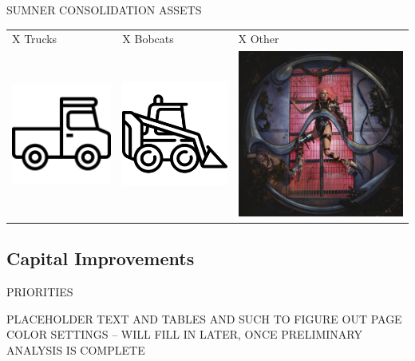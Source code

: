\textcolor{ccorange}{SUMNER CONSOLIDATION ASSETS}
\begin{table}[H]
\begin{tabular}{m{}m{}m{}}
{\color{ccorange} X Trucks} & {\color{ccorange} X Bobcats} & {\color{ccorange} X Other} \\
\includegraphics[width=.25\columnwidth]{truck.png}                            & \includegraphics[width=.25\columnwidth]{bobcat.png}                             & \includegraphics[width=.25\columnwidth]{chromatica.jpg}                          
\end{tabular}
\end{table}
\pagebreak
\textcolor{ccorange}{\section{Capital Improvements}}

\begin{table}[H]



\end{table}
\pagebreak

\textcolor{ccorange}{PRIORITIES}

PLACEHOLDER TEXT AND TABLES AND SUCH TO FIGURE OUT PAGE COLOR SETTINGS -- WILL FILL IN LATER, ONCE PRELIMINARY ANALYSIS IS COMPLETE
\pagebreak
\pagestyle{plain}
\pagecolor{ccfuschia}
\pagebreak
{}
\pagestyle{fancy}
\fancyhf{}
\renewcommand{\chaptermark}[1]{\markboth{#1}{}}
\fancyfoot[LE,RO]{\thepage}


